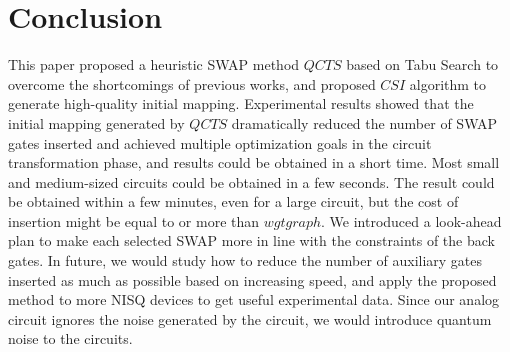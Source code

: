 \documentclass[runningheads]{llncs}
\begin{document}
\section{Conclusion}
\label{Conclusion}
This paper proposed a heuristic SWAP method $QCTS$ based on Tabu Search to overcome the shortcomings of previous works,
and proposed $CSI$ algorithm to generate high-quality initial mapping.
Experimental results showed that
the initial mapping generated by $QCTS$ dramatically reduced the number of SWAP gates inserted
and achieved multiple optimization goals in the circuit transformation phase,
and results could be obtained in a short time.
Most small and medium-sized circuits could be obtained in a few seconds.
The result could be obtained within a few minutes, even for a large circuit,
but the cost of insertion might be equal to or more than $wgtgraph$.
We introduced a look-ahead plan to make each selected SWAP more in line with the constraints of the back gates.
In future, we would study how to reduce the number of auxiliary gates inserted as much as possible based on increasing speed,
and apply the proposed method to more NISQ devices to get useful experimental data.
Since our analog circuit ignores the noise generated by the circuit,
we would introduce quantum noise to the circuits.

\appendix
\end{document}
